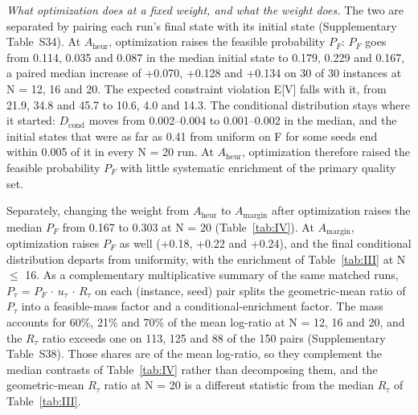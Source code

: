 \documentclass{ieeeaccess}
\begin{document}
\textit{What optimization does at a fixed weight, and what the weight does.} The two are separated by pairing each run's final state with its initial state (Supplementary Table~S34). At $A_{\mathrm{heur}}$, optimization raises the feasible probability $P_{F}$: $P_{F}$ goes from 0.114, 0.035 and 0.087 in the median initial state to 0.179, 0.229 and 0.167, a paired median increase of +0.070, +0.128 and +0.134 on 30 of 30 instances at N = 12, 16 and 20. The expected constraint violation E[V] falls with it, from 21.9, 34.8 and 45.7 to 10.6, 4.0 and 14.3. The conditional distribution stays where it started: $D_{\mathrm{cond}}$ moves from 0.002--0.004 to 0.001--0.002 in the median, and the initial states that were as far as 0.41 from uniform on F for some seeds end within 0.005 of it in every N = 20 run. At $A_{\mathrm{heur}}$, optimization therefore raised the feasible probability $P_{F}$ with little systematic enrichment of the primary quality set.


Separately, changing the weight from $A_{\mathrm{heur}}$ to $A_{\mathrm{margin}}$ after optimization raises the median $P_{F}$ from 0.167 to 0.303 at N = 20 (Table~\ref{tab:IV}). At $A_{\mathrm{margin}}$, optimization raises $P_{F}$ as well (+0.18, +0.22 and +0.24), and the final conditional distribution departs from uniformity, with the enrichment of Table~\ref{tab:III} at N $\leq$ 16. As a complementary multiplicative summary of the same matched runs, $P_{\tau}$ = $P_{F}$ $\cdot$ $u_{\tau}$ $\cdot$ $R_{\tau}$ on each (instance, seed) pair splits the geometric-mean ratio of $P_{\tau}$ into a feasible-mass factor and a conditional-enrichment factor. The mass accounts for 60\%, 21\% and 70\% of the mean log-ratio at N = 12, 16 and 20, and the $R_{\tau}$ ratio exceeds one on 113, 125 and 88 of the 150 pairs (Supplementary Table~S38). Those shares are of the mean log-ratio, so they complement the median contrasts of Table~\ref{tab:IV} rather than decomposing them, and the geometric-mean $R_{\tau}$ ratio at N = 20 is a different statistic from the median $R_{\tau}$ of Table~\ref{tab:III}.
\end{document}
